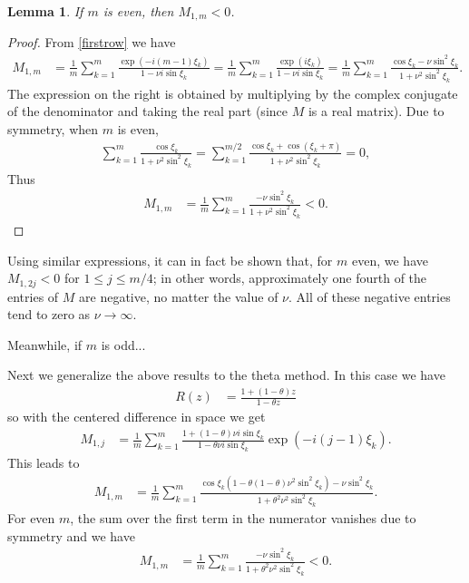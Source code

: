\documentclass[a4paper]{article}
\newtheorem{lemma}{Lemma}
\begin{document}
\begin{lemma}
    If $m$ is even, then $M_{1,m} < 0$.
\end{lemma}
\begin{proof}
    From \eqref{firstrow} we have
    \begin{align}  \label{M12}
        M_{1,m} & = \frac{1}{m} \sum_{k=1}^m \frac{ \exp(-i(m-1)\xi_k)}{1-\nu i \sin\xi_k}
                  = \frac{1}{m} \sum_{k=1}^m \frac{ \exp(i\xi_k)}{1-\nu i \sin\xi_k}
                  = \frac{1}{m} \sum_{k=1}^m \frac{\cos \xi_k - \nu \sin^2 \xi_k}{1+\nu^2 \sin^2 \xi_k}.
    \end{align}
    The expression on the right is obtained by multiplying by the complex
    conjugate of the denominator and taking the real part (since $M$ is a real matrix).
    Due to symmetry, when $m$ is even,
    \begin{align*}
        \sum_{k=1}^m \frac{\cos \xi_k}{1+\nu^2\sin^2\xi_k}  = \sum_{k=1}^{m/2} \frac{\cos \xi_k + \cos(\xi_k+\pi)}{1+\nu^2\sin^2\xi_k} = 0,
    \end{align*}
    Thus 
    \begin{align*} 
        M_{1,m} & = \frac{1}{m} \sum_{k=1}^m \frac{- \nu \sin^2 \xi_k}{1+\nu^2 \sin^2 \xi_k} < 0.
    \end{align*}
\end{proof}
Using similar expressions, it can in fact be shown that, for $m$ even, we have
$M_{1,2j}<0$ for $1\le j \le m/4$; in other words, approximately one fourth of
the entries of $M$ are negative, no matter the value of $\nu$.  All of these
negative entries tend to zero as $\nu \to \infty$.

Meanwhile, if $m$ is odd...


Next we generalize the above results to the theta method.  In this case we have
\begin{align}
    R(z) & = \frac{1+(1-\theta)z}{1-\theta z}
\end{align}
so with the centered difference in space we get
\begin{align} \label{firstrow-theta}
    M_{1,j} & = \frac{1}{m} \sum_{k=1}^m \frac{1+(1-\theta)\nu i\sin\xi_k}{1-\theta\nu i \sin\xi_k}\exp\left(-i(j-1)\xi_k\right).
\end{align}
This leads to
\begin{align*} 
    M_{1,m} & = \frac{1}{m} \sum_{k=1}^m \frac{\cos\xi_k(1-\theta(1-\theta)\nu^2\sin^2\xi_k)- \nu \sin^2 \xi_k}{1+\theta^2\nu^2 \sin^2 \xi_k}.
\end{align*}
For even $m$, the sum over the first term in the numerator vanishes due to symmetry and we have
\begin{align*}
    M_{1,m} & =  \frac{1}{m} \sum_{k=1}^m \frac{- \nu \sin^2 \xi_k}{1+\theta^2\nu^2 \sin^2 \xi_k} < 0.
\end{align*}
\end{document}
